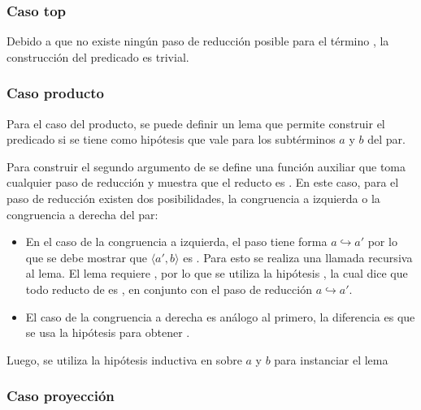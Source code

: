 
\subsubsection{Caso top}

Debido a que no existe ningún paso de reducción posible para el término \const{$\star$}, la construcción del predicado es trivial.


\subsubsection{Caso producto}

Para el caso del producto, se puede definir un lema que permite construir el predicado si se tiene como hipótesis que \snstar vale para los subtérminos $a$ y $b$ del par.


Para construir el segundo argumento de  se define una función auxiliar  que toma cualquier paso de reducción y muestra que el reducto es \snstar.
En este caso, para el paso de reducción  existen dos posibilidades, la congruencia a izquierda o la congruencia a derecha del par:
\begin{itemize}
	\item En el caso de la congruencia a izquierda, el paso  tiene forma $a \hookrightarrow a'$ por lo que se debe mostrar que $\langle a', b \rangle$ es \snstar.
	Para esto se realiza una llamada recursiva al lema.
	El lema requiere \snstar {}, por lo que se utiliza la hipótesis , la cual dice que todo reducto de  es \snstar, en conjunto con el paso de reducción $a \hookrightarrow a'$.
	\item El caso de la congruencia a derecha es análogo al primero, la diferencia es que se usa la hipótesis  para obtener \snstar {}.
\end{itemize}

Luego, se utiliza la hipótesis inductiva en  sobre $a$ y $b$ para instanciar el lema


\subsubsection{Caso proyección}

